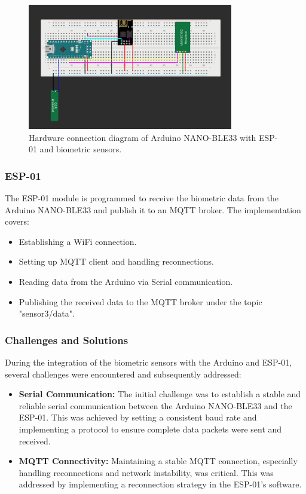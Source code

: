 \documentclass{article}
\begin{document}
\begin{figure}[h]
    \centering
    \includegraphics[width=0.8\textwidth]{../images/gsr&heart.png}
    \caption{Hardware connection diagram of Arduino NANO-BLE33 with ESP-01 and biometric sensors.}
    \label{fig:hardware-setup}
\end{figure}


\subsubsection{ESP-01}
The ESP-01 module is programmed to receive the biometric data from the Arduino NANO-BLE33 and publish it to an MQTT broker. The implementation covers:
\begin{itemize}
    \item Establishing a WiFi connection.
    \item Setting up MQTT client and handling reconnections.
    \item Reading data from the Arduino via Serial communication.
    \item Publishing the received data to the MQTT broker under the topic "sensor3/data".
\end{itemize}

\subsubsection{Challenges and Solutions}
During the integration of the biometric sensors with the Arduino and ESP-01, several challenges were encountered and subsequently addressed:
\begin{itemize}
\item \textbf{Serial Communication:} The initial challenge was to establish a stable and reliable serial communication between the Arduino NANO-BLE33 and the ESP-01. This was achieved by setting a consistent baud rate and implementing a protocol to ensure complete data packets were sent and received.
\item \textbf{MQTT Connectivity:} Maintaining a stable MQTT connection, especially handling reconnections and network instability, was critical. This was addressed by implementing a reconnection strategy in the ESP-01’s software.
\end{itemize}
\end{document}
